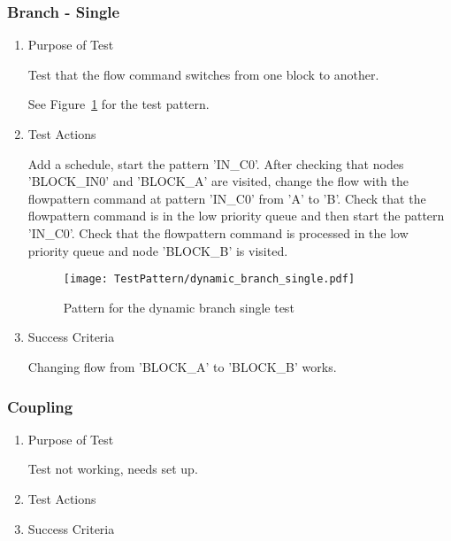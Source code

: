 \subsubsection{Branch - Single}
\begin{enumerate}
	\item Purpose of Test

	Test that the flow command switches from one block to another.

	See Figure~\ref{fig:Pattern_for_the_dynamic_branch_single_test} for the test pattern.
	\item Test Actions

	Add a schedule, start the pattern 'IN\_C0'. After checking that nodes 'BLOCK\_IN0' and 'BLOCK\_A' are visited,
        change the flow with the flowpattern command at pattern 'IN\_C0' from 'A' to 'B'. Check that the flowpattern
        command is in the low priority queue and then start the pattern 'IN\_C0'. Check that the flowpattern
        command is processed in the low priority queue and node 'BLOCK\_B' is visited.
    \begin{figure}
        \centering
        \texttt{[image: TestPattern/dynamic\_branch\_single.pdf]}
        \caption{Pattern for the dynamic branch single test}
        \label{fig:Pattern_for_the_dynamic_branch_single_test}
    \end{figure}
	\item Success Criteria

	Changing flow from 'BLOCK\_A' to 'BLOCK\_B' works.
\end{enumerate}
\subsubsection{Coupling}
\begin{enumerate}
	\item Purpose of Test

	Test not working, needs set up.
	\item Test Actions
	\item Success Criteria
\end{enumerate}
